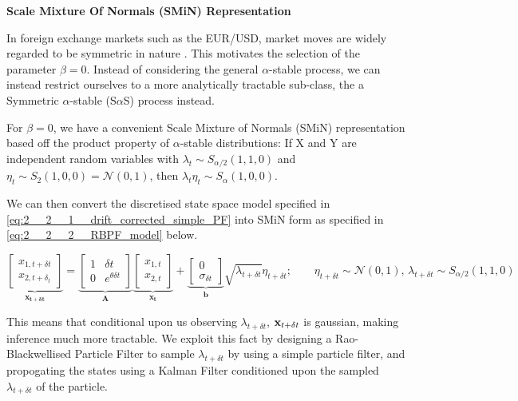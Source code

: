 \documentclass[../main.tex]{subfiles}
\begin{document}
\textbf{Scale Mixture Of Normals (SMiN) Representation}

In foreign exchange markets such as the EUR/USD, market moves are widely regarded to be symmetric in nature \cite{tankov2003financial}. This motivates the selection of the parameter $\beta = 0$. Instead of considering the general $\alpha$-stable process, we can instead restrict ourselves to a more analytically tractable sub-class, the a Symmetric $\alpha$-stable (S$\alpha$S) process instead.

For $\beta = 0$, we have a convenient Scale Mixture of Normals (SMiN) representation based off the product property of $\alpha$-stable distributions: If X and Y are independent random variables with $\lambda_t \sim S_{\alpha/2}(1, 1, 0)$ and $\eta_t \sim S_2(1,0,0) = \mathcal{N}(0,1)$, then $\lambda_t \eta_t \sim S_\alpha(1, 0, 0)$.

We can then convert the discretised state space model specified in \autoref{eq:2__2__1__drift_corrected_simple_PF} into SMiN form as specified in \autoref{eq:2__2__2__RBPF_model} below.

\begin{equation}
    \underbrace{
        \begin{bmatrix}
        x_{1,t+\delta t} \\ x_{2,t + \delta_t}
        \end{bmatrix}
    }_{\mathbf{x_{t + \delta t}}}
    =
    \underbrace{
        \begin{bmatrix}
        1 & \delta t \\ 0 & e^{\theta \delta t}
        \end{bmatrix}
    }_{\mathbf{A}}
    \underbrace{
        \begin{bmatrix}
        x_{1,t} \\ x_{2,t}
        \end{bmatrix}
    }_{\mathbf{x_t}}
    + 
    \underbrace{
        \begin{bmatrix}
        0 \\ \sigma_{\delta t}
        \end{bmatrix}
    }_{\mathbf{b}} \sqrt{\lambda_{t + \delta t}} \eta_{t + \delta t} ;
    \qquad \eta_{t + \delta t} \sim \mathcal{N}(0,1) \text{,   } \lambda_{t + \delta t} \sim S_{\alpha/2}(1,1,0)
    \label{eq:2__2__2__RBPF_model}
\end{equation}

This means that conditional upon us observing $\lambda_{t + \delta t}$, ${\bf x}_{t + \delta t}$ is gaussian, making inference much more tractable. We exploit this fact by designing a Rao-Blackwellised Particle Filter to sample $\lambda_{t + \delta t}$ by using a simple particle filter, and propogating the states using a Kalman Filter conditioned upon the sampled $\lambda_{t + \delta t}$ of the particle. 
\end{document}
